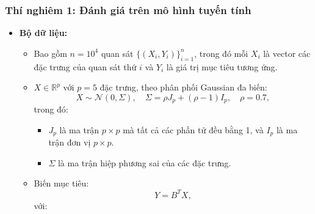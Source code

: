 \documentclass[12pt, a4paper]{article}
\begin{document}
\subsubsection{Thí nghiêm 1: Đánh giá trên mô hình tuyến tính}
    \begin{itemize}[align=parleft, left=4em, labelsep=1em, itemsep=1em]
        \item \textbf{Bộ dữ liệu:} 
          \begin{itemize}[label=$\circ$, left=1em, labelsep=0.75em, itemsep=0.5em]
            \item Bao gồm $n = 10^4$ quan sát $\{(X_i, Y_i)\}_{i=1}^{n}$, trong đó mỗi $X_i$ là vector các đặc trưng của quan sát thứ $i$ và $Y_i$ là giá trị mục tiêu tương ứng.
            
            \item $X \in \mathbb{R}^p$ với $p = 5$ đặc trưng, theo phân phối Gaussian đa biến: 
            \begin{equation*}
                X \sim \mathcal{N}(0, \Sigma), \quad 
                \Sigma = \rho J_p + (\rho - 1) I_p, \quad 
                \rho = 0.7,
            \end{equation*}
            trong đó:
            
                \begin{itemize}[label=$+$, labelsep=0.3em, itemsep=0.2em]
                    \item $J_p$ là ma trận $p \times p$ mà tất cả các phần tử đều bằng 1, và $I_p$ là ma trận đơn vị $p \times p$.

                    \item $\Sigma$ là ma trận hiệp phương sai của các đặc trưng.
                
                \end{itemize}
            

            
            
            
            \item Biến mục tiêu:
            \begin{equation*}
                Y = B^T X,
            \end{equation*}
            với:
            

\end{itemize}
\end{itemize}
\end{document}
